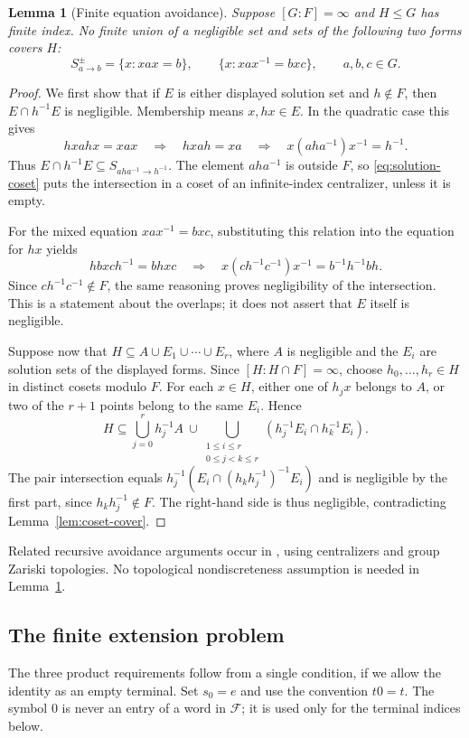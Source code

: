 \documentclass[11pt,letterpaper]{amsart}
\newtheorem{lemma}[theorem]{Lemma}
\theoremstyle{definition}
\theoremstyle{remark}
\begin{document}
\begin{lemma}[Finite equation avoidance]\label{lem:avoid}
Suppose $[G:F]=\infty$ and $H\leq G$ has finite index. No finite union
of a negligible set and sets of the following two forms covers $H$:
\[
 S^{\pm}_{a\to b}=\{x:xax=b\},\qquad
 \{x:xax^{-1}=bxc\},\qquad a,b,c\in G.
\]
\end{lemma}
\begin{proof}
We first show that if $E$ is either displayed solution set and
$h\notin F$, then $E\cap h^{-1}E$ is negligible. Membership means
$x,hx\in E$. In the quadratic case this gives
\[
 hxahx=xax
 \quad\Longrightarrow\quad
 hxah=xa
 \quad\Longrightarrow\quad
 x(aha^{-1})x^{-1}=h^{-1}.
\]
Thus $E\cap h^{-1}E\subseteq S_{aha^{-1}\to h^{-1}}$.
The element $aha^{-1}$ is outside $F$, so
\eqref{eq:solution-coset} puts the intersection in a coset of an
infinite-index centralizer, unless it is empty.

For the mixed equation $xax^{-1}=bxc$, substituting this relation
into the equation for $hx$ yields
\[
 hbxch^{-1}=bhxc
 \quad\Longrightarrow\quad
 x(ch^{-1}c^{-1})x^{-1}=b^{-1}h^{-1}bh.
\]
Since $ch^{-1}c^{-1}\notin F$, the same reasoning proves negligibility
of the intersection. This is a statement about the overlaps; it does
not assert that $E$ itself is negligible.

Suppose now that $H\subseteq A\cup E_1\cup\cdots\cup E_r$, where
$A$ is negligible and the $E_i$ are solution sets of the displayed
forms. Since $[H:H\cap F]=\infty$, choose $h_0,\ldots,h_r\in H$
in distinct cosets modulo $F$. For each $x\in H$, either one of
$h_jx$ belongs to $A$, or two of the $r+1$ points belong to the same
$E_i$. Hence
\[
 H\subseteq\bigcup_{j=0}^r h_j^{-1}A\ \cup\!
 \bigcup_{\substack{1\leq i\leq r\\0\leq j<k\leq r}}
 (h_j^{-1}E_i\cap h_k^{-1}E_i).
\]
The pair intersection equals
$h_j^{-1}(E_i\cap(h_kh_j^{-1})^{-1}E_i)$ and is negligible by the
first part, since $h_kh_j^{-1}\notin F$. The right-hand side is thus
negligible, contradicting Lemma~\ref{lem:coset-cover}.
\end{proof}

Related recursive avoidance arguments occur in
\cite[Theorems~4 and~5]{BP}, using centralizers and group Zariski
topologies. No topological nondiscreteness assumption is needed in
Lemma~\ref{lem:avoid}.

\subsection{The finite extension problem}
The three product requirements follow from a single condition,
if we allow the identity as an empty terminal. Set $s_0=e$ and use the
convention $t0=t$. The symbol $0$ is never an entry of a word in
$\mathcal F$; it is used only for the terminal indices below.
\end{document}
